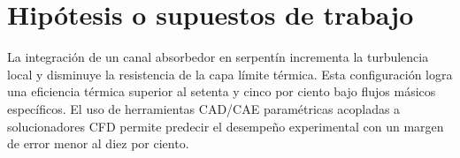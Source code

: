 \section{Hipótesis o supuestos de trabajo}
\label{sec:cap01_hipotesis}

La integración de un canal absorbedor en serpentín incrementa la turbulencia local y disminuye la resistencia de la capa límite térmica.
Esta configuración logra una eficiencia térmica superior al setenta y cinco por ciento bajo flujos másicos específicos.
El uso de herramientas CAD/CAE paramétricas acopladas a solucionadores CFD permite predecir el desempeño experimental con un margen de error menor al diez por ciento.
